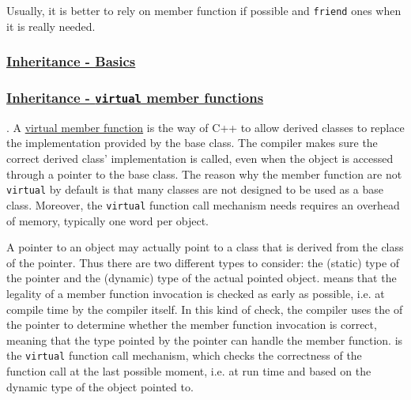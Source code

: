 Usually, it is better to rely on member function if possible and \texttt{friend} 
ones when it is really needed.

\subsubsection{\href{https://isocpp.org/wiki/faq/basics-of-inheritance}{\textbf{Inheritance - Basics}}}
\label{subsubsec:inheritance-basics}


\subsubsection{\href{https://isocpp.org/wiki/faq/virtual-functions}{Inheritance - \textbf{\texttt{virtual} member functions}}}.
\newline
A \href{https://en.cppreference.com/w/cpp/language/virtual}{virtual member function} 
is the way of C++ to allow derived classes to replace the implementation 
provided by the base class. The compiler makes sure the correct 
derived class' implementation is called, even when the object is 
accessed through a pointer to the base class.
\newline
The reason why the member function are not \texttt{virtual} by default 
is that many classes are not designed to be used as a base class. 
Moreover, the \texttt{virtual} function call mechanism needs requires 
an overhead of memory, typically one word per object.

A pointer to an object may actually point to a class that is derived 
from the class of the pointer. Thus there are two different types 
to consider: the (static) type of the pointer and the (dynamic) type 
of the actual pointed object.
\newline
{} means that the legality of a member function 
invocation is checked as early as possible, i.e. at compile time by the 
compiler itself. In this kind of check, the compiler uses the 
 of the pointer to determine whether the member 
function invocation is correct, meaning that the type pointed by the 
pointer can handle the member function.
\newline
{} is the \texttt{virtual} function call 
mechanism, which checks the correctness of the function call at the last 
possible moment, i.e. at run time and based on the dynamic type of 
the object pointed to.

